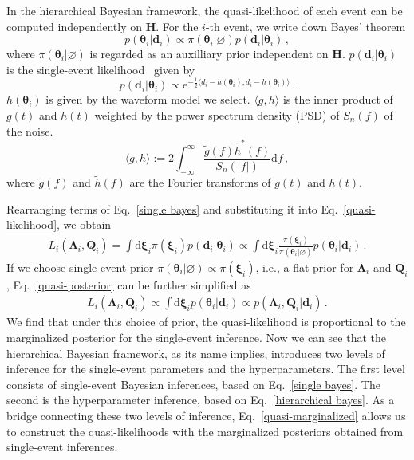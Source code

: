 \documentclass[a4paper,11pt]{article}
\begin{document}
In the hierarchical Bayesian framework, the quasi-likelihood of each event can be 
computed independently on $\bm{H}$. For the $i\text{-th}$ event, we write down Bayes' theorem
\begin{equation}
\label{single bayes}
    p(\bm{\theta}_i|\bm{d}_i)\propto \pi(\bm{\theta}_i|\varnothing)p(\bm{d}_i|\bm{\theta}_i)\,,
\end{equation}
where $\pi(\bm{\theta}_i|\varnothing)$ is regarded as an auxilliary prior 
independent on $\bm{H}$. $p(\bm{d}_i|\bm{\theta}_i)$ is the single-event likelihood~\cite{Finn:1992wt} given by
\begin{equation}
p(\bm{d}_i|\bm{\theta}_i)\propto \mathrm{e}^{-\frac{1}{2}\langle d_i-h(\bm{\theta}_i),d_i-h(\bm{\theta}_i)\rangle}\,.
\end{equation}
$h(\bm{\theta}_i)$ is given by the waveform model we select. $\langle g, h\rangle$ 
is the inner product of $g(t)$ and $h(t)$ weighted by the power spectrum density (PSD) of $S_n(f)$ of the noise.
\begin{equation}
    \langle g, h\rangle:= 2\int_{-\infty}^{\infty}\frac{\tilde{g}(f)\tilde{h}^{*}(f)}{S_n(|f|)} \text{d}f\,,
\end{equation}
where $\tilde{g}(f)$ and $\tilde{h}(f)$ are the Fourier transforms of $g(t)$ and $h(t)$.

Rearranging terms of Eq.~\eqref{single bayes} and substituting it into Eq.~\eqref{quasi-likelihood}, we obtain
\begin{equation}
\label{quasi-posterior}
\begin{aligned}
    L_i(\bm{\Lambda}_i,\bm{Q}_i) = \int \text{d}\bm{\xi}_i \pi(\bm{\xi}_i)p(\bm{d}_i|\bm{\theta}_i) \propto \int \text{d}\bm{\xi}_i \frac{\pi(\bm{\xi}_i)}{\pi(\bm{\theta}_i|\varnothing)}p(\bm{\theta}_i|\bm{d}_i)\,.
\end{aligned}  
\end{equation}
If we choose single-event prior $\pi(\bm{\theta}_i|\varnothing)\propto\pi(\bm{\xi}_i)$, 
i.e., a flat prior for $\bm{\Lambda}_i$ and $\bm{Q}_i$, Eq.~\eqref{quasi-posterior} can be further simplified as 
\begin{equation}
\label{quasi-marginalized}
\begin{aligned}
    L_i(\bm{\Lambda}_i,\bm{Q}_i) \propto \int \text{d}\bm{\xi}_i p(\bm{\theta}_i|\bm{d}_i)\propto p(\bm{\Lambda}_i,\bm{Q}_i|\bm{d}_i)\,.
\end{aligned}  
\end{equation}
We find that under this choice of prior, the quasi-likelihood is proportional to 
the marginalized posterior for the single-event inference. Now we can see that the 
hierarchical Bayesian framework, as its name implies, introduces two levels of 
inference for the single-event parameters and the hyperparameters. The first level 
consists of single-event Bayesian inferences, based on Eq.~\eqref{single bayes}. 
The second is the hyperparameter inference, based on Eq.~\eqref{hierarchical 
bayes}. As a bridge connecting these two levels of inference, Eq.~\eqref{quasi-marginalized} 
allows us to construct the quasi-likelihoods with the marginalized posteriors obtained from single-event inferences.
\end{document}
